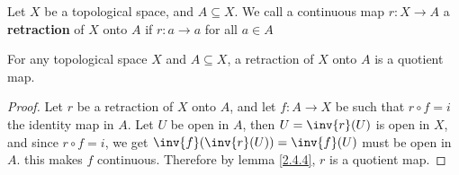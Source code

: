 \begin{definition}
    Let $X$ be a topological space, and  $A \subseteq X$. We call a continuous
    map $r:X \rightarrow A$ a \textbf{retraction} of $X$ onto  $A$ if
    $r:a \rightarrow a$ for all $a \in A$
\end{definition}

\begin{lemma}\label{2.4.8}
    For any topological space $X$ and  $A \subseteq X$, a retraction of  $X$
    onto  $A$ is a quotient map.
\end{lemma}
\begin{proof}
    Let $r$ be a retraction of  $X$ onto  $A$, and let  $f:A \rightarrow X$ be
    such that $r \circ f=i$ the identity map in  $A$. Let  $U$ be open in  $A$,
    then  $U=\inv{r}(U)$ is open in $X$, and since  $r \circ f=i$, we get
    $\inv{f}(\inv{r}(U))=\inv{f}(U)$ must be open in $A$. this makes  $f$
    continuous. Therefore by lemma \ref{2.4.4}, $r$ is a quotient map.
\end{proof}
